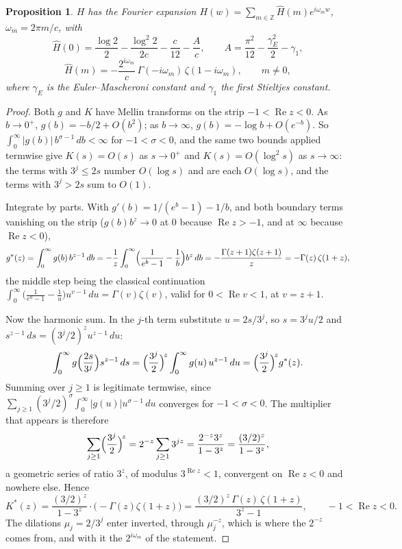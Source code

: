 \documentclass[11pt]{amsart}
\theoremstyle{plain}
\newtheorem{proposition}[theorem]{Proposition}
\theoremstyle{definition}
\theoremstyle{remark}
\newcommand{\Z}{\mathbb{Z}}
\begin{document}
\begin{proposition}
\label{prop:Hfourier}
$H$ has the Fourier expansion $H(w) = \sum_{m\in\Z} \hat H(m) e^{i\omega_m w}$, $\omega_m =
2\pi m/c$, with
\[
\hat H(0) = \frac{\log 2}{2} - \frac{\log^2 2}{2c} - \frac{c}{12} - \frac{A}{c}, \qquad
A = \frac{\pi^2}{12} - \frac{\gamma_E^2}{2} - \gamma_1,
\]
\[
\hat H(m) = -\frac{2^{i\omega_m}}{c}\, \Gamma(-i\omega_m)\, \zeta(1-i\omega_m), \qquad m \ne 0,
\]
where $\gamma_E$ is the Euler--Mascheroni constant and $\gamma_1$ the first Stieltjes constant.
\end{proposition}

\begin{proof}
Both $g$ and $K$ have Mellin transforms on the strip $-1<\operatorname{Re}z<0$. As $b\to0^+$,
$g(b)=-b/2+O(b^2)$; as $b\to\infty$, $g(b)=-\log b+O(e^{-b})$. So $\int_0^\infty
|g(b)|\,b^{\sigma-1}\,db<\infty$ for $-1<\sigma<0$, and the same two bounds applied termwise give
$K(s)=O(s)$ as $s\to0^+$ and $K(s)=O(\log^2 s)$ as $s\to\infty$: the terms with $3^j\le2s$ number
$O(\log s)$ and are each $O(\log s)$, and the terms with $3^j>2s$ sum to $O(1)$.

Integrate by parts. With $g'(b)=1/(e^b-1)-1/b$, and both boundary terms vanishing on the strip
($g(b)b^z\to0$ at $0$ because $\operatorname{Re}z>-1$, and at $\infty$ because
$\operatorname{Re}z<0$),
\[
g^*(z) = \int_0^\infty g(b)\,b^{z-1}\,db = -\frac1z\int_0^\infty\Bigl(\frac{1}{e^b-1}-\frac1b\Bigr)b^z\,db
= -\frac{\Gamma(z+1)\zeta(z+1)}{z} = -\Gamma(z)\,\zeta(1+z),
\]
the middle step being the classical continuation
$\int_0^\infty\bigl(\tfrac{1}{e^u-1}-\tfrac1u\bigr)u^{v-1}\,du=\Gamma(v)\zeta(v)$, valid for
$0<\operatorname{Re}v<1$, at $v=z+1$.

Now the harmonic sum. In the $j$-th term substitute $u=2s/3^j$, so $s=3^ju/2$ and
$s^{z-1}\,ds=(3^j/2)^z u^{z-1}\,du$:
\[
\int_0^\infty g\Bigl(\frac{2s}{3^j}\Bigr)s^{z-1}\,ds = \Bigl(\frac{3^j}{2}\Bigr)^{\!z}\int_0^\infty
g(u)\,u^{z-1}\,du = \Bigl(\frac{3^j}{2}\Bigr)^{\!z} g^*(z).
\]
Summing over $j\ge1$ is legitimate termwise, since $\sum_{j\ge1}(3^j/2)^\sigma\int_0^\infty
|g(u)|u^{\sigma-1}\,du$ converges for $-1<\sigma<0$. The multiplier that appears is therefore
\[
\sum_{j\ge1}\Bigl(\frac{3^j}{2}\Bigr)^{\!z} = 2^{-z}\sum_{j\ge1}3^{jz} = \frac{2^{-z}3^z}{1-3^z}
= \frac{(3/2)^z}{1-3^z},
\]
a geometric series of ratio $3^z$, of modulus $3^{\operatorname{Re}z}<1$, convergent on
$\operatorname{Re}z<0$ and nowhere else. Hence
\begin{equation}
\label{eq:Kstar}
K^*(z) = \frac{(3/2)^z}{1-3^z}\cdot\bigl(-\Gamma(z)\zeta(1+z)\bigr)
= \frac{(3/2)^z\,\Gamma(z)\,\zeta(1+z)}{3^z-1}, \qquad -1<\operatorname{Re}z<0.
\end{equation}
The dilations $\mu_j=2/3^j$ enter inverted, through $\mu_j^{-z}$, which is where the $2^{-z}$ comes
from, and with it the $2^{i\omega_m}$ of the statement.


\end{proof}
\end{document}
